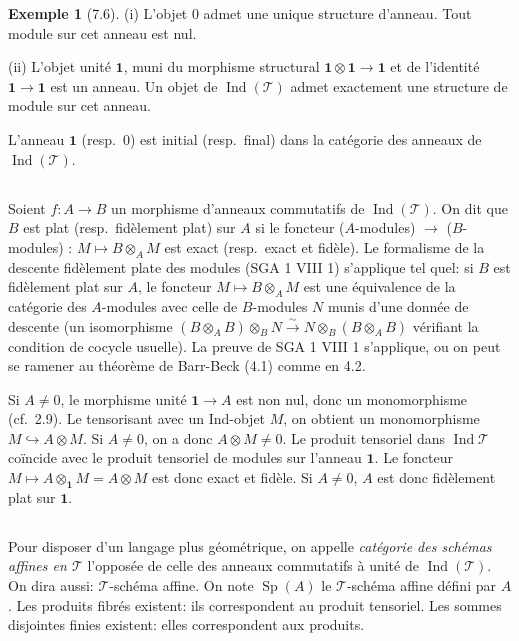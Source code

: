 \documentclass[12pt,a4paper]{article}
\theoremstyle{plain}
\theoremstyle{definition}
\newtheorem{example}[theorem]{Exemple}
\DeclareMathOperator{\Sp}{Sp}
\DeclareMathOperator{\Ind}{Ind}
\begin{document}
\begin{example}[7.6]
\textup{(i)} L'objet 0 admet une unique structure d'anneau. Tout module sur cet anneau est nul.

\textup{(ii)} L'objet unité $\mathbf{1}$, muni du morphisme structural $\mathbf{1} \otimes \mathbf{1} \to \mathbf{1}$ et de l'identité $\mathbf{1} \to \mathbf{1}$ est un anneau. Un objet de $\Ind(\mathcal{T})$ admet exactement une structure de module sur cet anneau.

L'anneau $\mathbf{1}$ (resp.~0) est initial (resp.~final) dans la catégorie des anneaux de $\Ind(\mathcal{T})$.
\end{example}

\subsection{}

Soient $f : A \to B$ un morphisme d'anneaux commutatifs de $\Ind(\mathcal{T})$. On dit que $B$ est plat (resp.~fidèlement plat) sur $A$ si le foncteur ($A$-modules) $\to$ ($B$-modules) : $M \mapsto B \otimes_A M$ est exact (resp.~exact et fidèle). Le formalisme de la descente fidèlement plate des modules (SGA 1 VIII 1) s'applique tel quel: si $B$ est fidèlement plat sur $A$, le foncteur $M \mapsto B \otimes_A M$ est une équivalence de la catégorie des $A$-modules avec celle de $B$-modules $N$ munis d'une donnée de descente (un isomorphisme $(B \otimes_A B) \otimes_B N \xrightarrow{\sim} N \otimes_B (B \otimes_A B)$ vérifiant la condition de cocycle usuelle). La preuve de SGA 1 VIII 1 s'applique, ou on peut se ramener au théorème de Barr-Beck (4.1) comme en 4.2.

Si $A \neq 0$, le morphisme unité $\mathbf{1} \to A$ est non nul, donc un monomorphisme (cf.~2.9). Le tensorisant avec un Ind-objet $M$, on obtient un monomorphisme $M \hookrightarrow A \otimes M$. Si $A \neq 0$, on a donc $A \otimes M \neq 0$. Le produit tensoriel dans $\Ind\mathcal{T}$ coïncide avec le produit tensoriel de modules sur l'anneau $\mathbf{1}$. Le foncteur $M \mapsto A \otimes_\mathbf{1} M = A \otimes M$ est donc exact et fidèle. Si $A \neq 0$, $A$ est donc fidèlement plat sur $\mathbf{1}$.

\subsection{}

Pour disposer d'un langage plus géométrique, on appelle \emph{catégorie des schémas affines en $\mathcal{T}$} l'opposée de celle des anneaux commutatifs à unité de $\Ind(\mathcal{T})$. On dira aussi: $\mathcal{T}$-schéma affine. On note $\Sp(A)$ le $\mathcal{T}$-schéma affine défini par $A$. Les produits fibrés existent: ils correspondent au produit tensoriel. Les sommes disjointes finies existent: elles correspondent aux produits.
\end{document}
